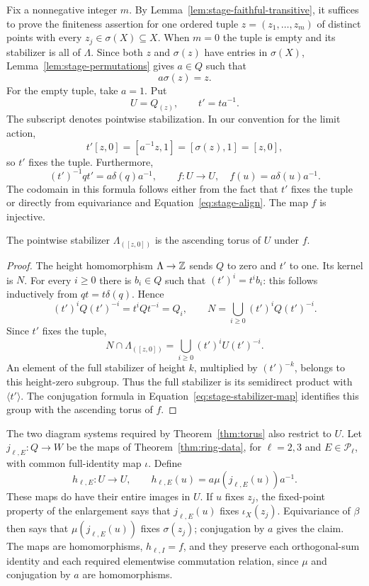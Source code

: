 Fix a nonnegative integer $m$.  By
Lemma~\ref{lem:stage-faithful-transitive}, it suffices to prove the
finiteness assertion for one ordered tuple $z=(z_1,\ldots,z_m)$
of distinct points with every $z_j\in\sigma(X)\subseteq X$.
When $m=0$ the tuple is empty and its stabilizer is all of
$\Lambda$.  Since both $z$ and $\sigma(z)$ have entries in
$\sigma(X)$, Lemma~\ref{lem:stage-permutations} gives $a\in Q$
such that
\begin{equation}\label{eq:stage-align}
 a\sigma(z)=z.
\end{equation}
For the empty tuple, take $a=1$.
Put
\[
 U=Q_{(z)},\qquad t'=ta^{-1}.
\]
The subscript denotes pointwise stabilization.  In our convention
for the limit action,
\[
 t'[z,0]=[a^{-1}z,1]=[\sigma(z),1]=[z,0],
\]
so $t'$ fixes the tuple.  Furthermore,
\begin{equation}\label{eq:stage-stabilizer-map}
 (t')^{-1}qt'=a\delta(q)a^{-1},
 \qquad
 f:U\longrightarrow U,
 \quad f(u)=a\delta(u)a^{-1}.
\end{equation}
The codomain in this formula follows either from the fact that $t'$
fixes the tuple or directly from equivariance and
Equation~\eqref{eq:stage-align}.  The map $f$ is injective.

\begin{lemma}\label{lem:stage-stabilizer-torus}
The pointwise stabilizer $\Lambda_{([z,0])}$ is the ascending torus
of $U$ under $f$.
\end{lemma}

\begin{proof}
The height homomorphism $\Lambda\to\mathbb Z$ sends $Q$ to zero and
$t'$ to one.  Its kernel is $N$.  For every $i\ge0$ there is
$b_i\in Q$ such that $(t')^i=t^i b_i$: this follows inductively
from $qt=t\delta(q)$.  Hence
\[
 (t')^iQ(t')^{-i}=t^iQt^{-i}=Q_i,
 \qquad N=\bigcup_{i\ge0}(t')^iQ(t')^{-i}.
\]
Since $t'$ fixes the tuple,
\[
 N\cap\Lambda_{([z,0])}
   =\bigcup_{i\ge0}(t')^iU(t')^{-i}.
\]
An element of the full stabilizer of height $k$, multiplied by
$(t')^{-k}$, belongs to this height-zero subgroup.  Thus the full
stabilizer is its semidirect product with $\langle t'\rangle$.
The conjugation formula in
Equation~\eqref{eq:stage-stabilizer-map} identifies this group
with the ascending torus of $f$.
\end{proof}

The two diagram systems required by Theorem~\ref{thm:torus}
also restrict to $U$.  Let
$j_{\ell,E}:Q\to W$ be the maps of
Theorem~\ref{thm:ring-data}, for $\ell=2,3$ and
$E\in\mathcal P_\ell$, with common full-identity map $\iota$.
Define
\begin{equation}\label{eq:stage-stabilizer-diagrams}
 h_{\ell,E}:U\longrightarrow U,
 \qquad
 h_{\ell,E}(u)=a\mu(j_{\ell,E}(u))a^{-1}.
\end{equation}
These maps do have their entire images in $U$.  If $u$ fixes $z_j$,
the fixed-point property of the enlargement says that
$j_{\ell,E}(u)$ fixes $\iota_X(z_j)$.  Equivariance of $\beta$
then says that $\mu(j_{\ell,E}(u))$ fixes $\sigma(z_j)$;
conjugation by $a$ gives the claim.  The maps are homomorphisms,
$h_{\ell,I}=f$, and they preserve each orthogonal-sum identity
and each required elementwise commutation relation, since $\mu$
and conjugation by $a$ are homomorphisms.

